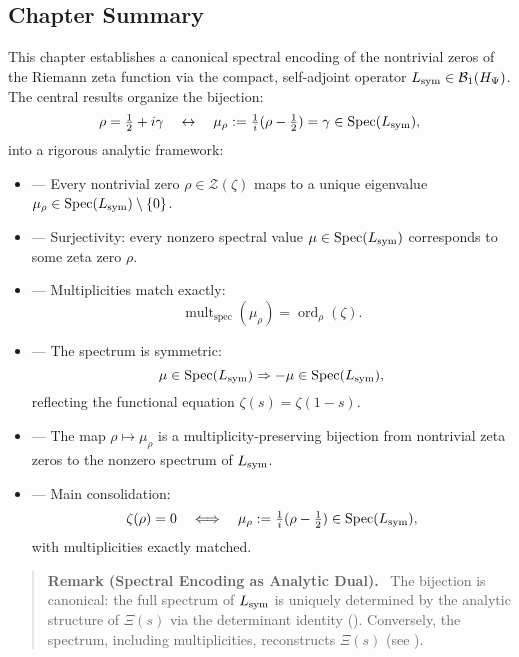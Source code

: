 \subsection*{Chapter Summary}

This chapter establishes a canonical spectral encoding of the nontrivial zeros of the Riemann zeta function via the compact, self-adjoint operator \( L_{\mathrm{sym}} \in \mathcal{B}_1(H_{\Psi}) \). The central results organize the bijection:
\[
\rho = \tfrac{1}{2} + i\gamma \quad \leftrightarrow \quad \mu_\rho := \tfrac{1}{i}(\rho - \tfrac{1}{2}) = \gamma \in \operatorname{Spec}(L_{\mathrm{sym}}),
\]
into a rigorous analytic framework:

\begin{itemize}
  \item {} — Every nontrivial zero \( \rho \in \mathcal{Z}(\zeta) \) maps to a unique eigenvalue \( \mu_\rho \in \operatorname{Spec}(L_{\mathrm{sym}}) \setminus \{0\} \).

  \item {} — Surjectivity: every nonzero spectral value \( \mu \in \operatorname{Spec}(L_{\mathrm{sym}}) \) corresponds to some zeta zero \( \rho \).

  \item {} — Multiplicities match exactly:
  \[
  \operatorname{mult}_{\mathrm{spec}}(\mu_\rho) = \operatorname{ord}_\rho(\zeta).
  \]

  \item {} — The spectrum is symmetric:
  \[
  \mu \in \operatorname{Spec}(L_{\mathrm{sym}}) \Rightarrow -\mu \in \operatorname{Spec}(L_{\mathrm{sym}}),
  \]
  reflecting the functional equation \( \zeta(s) = \zeta(1 - s) \).

  \item {} — The map \( \rho \mapsto \mu_\rho \) is a multiplicity-preserving bijection from nontrivial zeta zeros to the nonzero spectrum of \( L_{\mathrm{sym}} \).

  \item {} — Main consolidation:
  \[
  \zeta(\rho) = 0 \quad \Longleftrightarrow \quad \mu_\rho := \tfrac{1}{i}(\rho - \tfrac{1}{2}) \in \operatorname{Spec}(L_{\mathrm{sym}}),
  \]
  with multiplicities exactly matched.
\end{itemize}

\begin{quote}
  \textbf{Remark (Spectral Encoding as Analytic Dual).}~
  The bijection is canonical: the full spectrum of \( L_{\mathrm{sym}} \) is uniquely determined by the analytic structure of \( \Xi(s) \) via the determinant identity (). Conversely, the spectrum, including multiplicities, reconstructs \( \Xi(s) \) (see ).
\end{quote}

